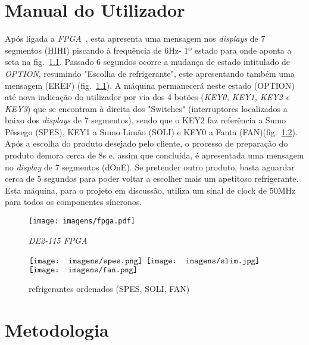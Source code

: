 \documentclass{report}
\begin{document}
\chapter{Manual do Utilizador}
\label{chap.manual}
Após ligada a \textit{FPGA}~\cite{unknown2021}, esta apresenta uma mensagem nos \textit{displays} de 7 segmentos (HIHI) piscando à frequência de 6Hz- 1º estado para onde aponta a seta na fig.~\ref{fig6:fpga}. Passado 6 segundos ocorre a mudança de estado intitulado de \textit{OPTION}, resumindo "Escolha de refrigerante", este  apresentando também uma mensagem (EREF) (fig.~\ref{fig6:fpga}). A máquina permanecerá neste estado (OPTION) até nova indicação do utilizador por via dos 4 botões (\textit{KEY0, KEY1, KEY2 e KEY3}) que se encontram à direita dos "Switches" (interruptores localizados a baixo dos \textit{displays} de 7 segmentos), sendo que o KEY2 faz referência a Sumo Pêssego (SPES), KEY1 a Sumo Limão (SOLI) e KEY0 a Fanta (FAN)(fig.~\ref{refrig}). Após a escolha do produto desejado pelo cliente, o processo de preparação do produto demora cerca de 8s e, assim que concluída, é apresentada uma mensagem no \textit{display} de 7 segmentos (dOnE). Se pretender outro produto, basta aguardar cerca de 5 segundos para poder voltar a escolher mais um apetitoso refrigerante. Esta máquina, para o projeto em discussão, utiliza um sinal de clock de 50MHz para todos os componentes síncronos. %


\begin{figure} 
    \centering
    \texttt{[image: imagens/fpga.pdf]}
    \caption{\textit{DE2-115 FPGA}} \label{fig6:fpga}
\end{figure}

  \begin{figure}[!h]
\centering
  $\vcenter{\hbox{\texttt{[image: imagens/spes.png]}}}$
  \qquad
  $\vcenter{\hbox{\texttt{[image: imagens/slim.jpg]}}}$
  \qquad
  $\vcenter{\hbox{\texttt{[image: imagens/fan.png]}}}$
\caption{refrigerantes ordenados (SPES, SOLI, FAN)}
\label{refrig}
\end{figure}


\chapter{Metodologia}
\label{chap.metodologia}
\end{document}
